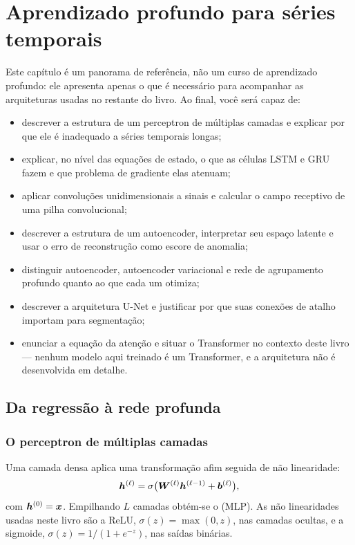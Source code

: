 \chapter{Aprendizado profundo para séries temporais}
\label{cap:profundo}

\begin{objetivos}
Este capítulo é um panorama de referência, não um curso de aprendizado profundo: ele
apresenta apenas o que é necessário para acompanhar as arquiteturas usadas no restante
do livro. Ao final, você será capaz de:
\begin{itemize}[leftmargin=*,itemsep=0.2em]
  \item descrever a estrutura de um perceptron de múltiplas camadas e explicar por que
        ele é inadequado a séries temporais longas;
  \item explicar, no nível das equações de estado, o que as células LSTM e GRU fazem e
        que problema de gradiente elas atenuam;
  \item aplicar convoluções unidimensionais a sinais e calcular o campo receptivo de uma
        pilha convolucional;
  \item descrever a estrutura de um autoencoder, interpretar seu espaço latente e usar o
        erro de reconstrução como escore de anomalia;
  \item distinguir autoencoder, autoencoder variacional e rede de agrupamento profundo
        quanto ao que cada um otimiza;
  \item descrever a arquitetura U-Net e justificar por que suas conexões de atalho
        importam para segmentação;
  \item enunciar a equação da atenção e situar o Transformer no contexto deste livro ---
        nenhum modelo aqui treinado é um Transformer, e a arquitetura não é desenvolvida
        em detalhe.
\end{itemize}
\end{objetivos}

\section{Da regressão à rede profunda}

\subsection{O perceptron de múltiplas camadas}

Uma camada densa aplica uma transformação afim seguida de não linearidade:
\begin{equation}
  \bm{h}^{(\ell)} = \sigma\big( \bm{W}^{(\ell)} \bm{h}^{(\ell-1)} + \bm{b}^{(\ell)} \big),
  \label{eq:camada-densa}
\end{equation}
com $\bm{h}^{(0)} = \bm{x}$. Empilhando $L$ camadas obtém-se o  (MLP). As não linearidades usadas neste livro
são a ReLU, $\sigma(z) = \max(0, z)$, nas camadas ocultas, e a sigmoide,
$\sigma(z) = 1/(1 + e^{-z})$, nas saídas binárias.

